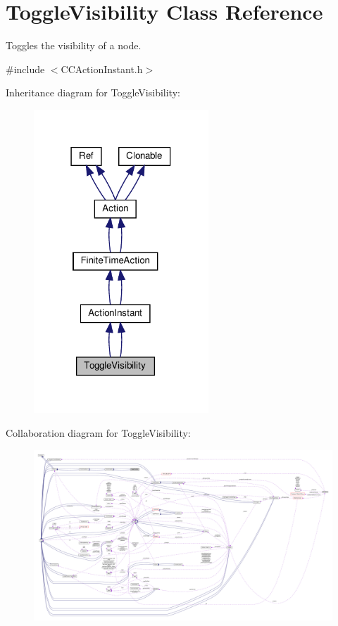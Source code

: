 \hypertarget{classToggleVisibility}{}\section{Toggle\+Visibility Class Reference}
\label{classToggleVisibility}


Toggles the visibility of a node.  




{\ttfamily \#include $<$C\+C\+Action\+Instant.\+h$>$}



Inheritance diagram for Toggle\+Visibility\+:
\nopagebreak
\begin{figure}[H]
\begin{center}
\leavevmode
\includegraphics[width=186pt]{classToggleVisibility__inherit__graph}
\end{center}
\end{figure}


Collaboration diagram for Toggle\+Visibility\+:
\nopagebreak
\begin{figure}[H]
\begin{center}
\leavevmode
\includegraphics[width=350pt]{classToggleVisibility__coll__graph}
\end{center}
\end{figure}
